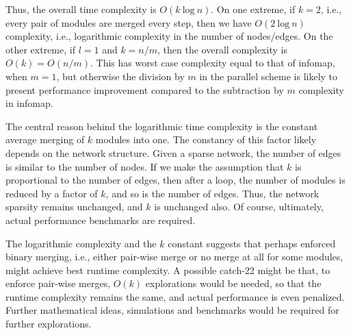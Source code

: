\documentclass[12pt,a4paper]{article}
\begin{document}
Thus, the overall time complexity is \(O(k~\mathrm{log}~n)\). On one extreme, if \(k=2\), i.e., every pair of modules are merged every step, then we have \(O(2~\mathrm{log}~n)\) complexity, i.e., logarithmic complexity in the number of nodes/edges. On the other extreme, if \(l=1\) and \(k=n/m\), then the overall complexity is \(O(k) = O(n/m)\). This has worst case complexity equal to that of infomap, when \(m=1\), but otherwise the division by \(m\) in the parallel scheme is likely to present performance improvement compared to the subtraction by \(m\) complexity in infomap.

The central reason behind the logarithmic time complexity is the constant average merging of \(k\) modules into one. The constancy of this factor likely depends on the network structure. Given a sparse network, the number of edges is similar to the number of nodes. If we make the assumption that \(k\) is proportional to the number of edges, then after a loop, the number of modules is reduced by a factor of \(k\), and so is the number of edges. Thus, the network sparsity remains unchanged, and \(k\) is unchanged also. Of course, ultimately, actual performance benchmarks are required.

The logarithmic complexity and the \(k\) constant suggests that perhaps enforced binary merging, i.e., either pair-wise merge or no merge at all for some modules, might achieve best runtime complexity. A possible catch-22 might be that, to enforce pair-wise merges, \(O(k)\) explorations would be needed, so that the runtime complexity remains the same, and actual performance is even penalized. Further mathematical ideas, simulations and benchmarks would be required for further explorations.
\end{document}
